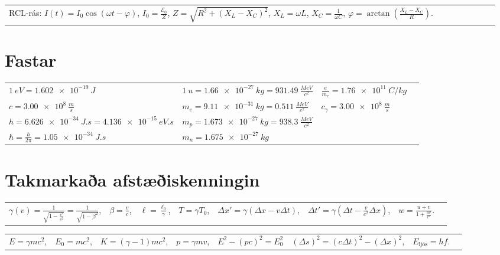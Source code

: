 \begin{table}[H]
\begin{tabular}{llllllll}
RCL-rás: $I(t) = I_0 \cos(\omega t - \varphi)$, $I_0 = \frac{\mathcal{E}_0}{Z}$, $Z = \sqrt{R^2 + (X_L - X_C)^2}$, $X_L = \omega L$, $X_C = \frac{1}{\omega C}$, $\displaystyle \varphi = \arctan( \frac{X_L - X_C}{R})$.
\end{tabular}
\end{table}

\newpage

\section*{Fastar}

\begin{table}[H]
\begin{tabular}{llll}
$\SI{1}{eV} = \SI{1.602e-19}{J}$ &  $\SI{1}{u} = \SI{1.66e-27}{kg} = \SI{931.49}{\frac{MeV}{c^2}}$ & $\frac{e}{m_e} = \SI{1.76e11}{C/kg}$  &  \\
$c = \SI{3.00e8}{\frac{m}{s}}$ & $m_e = \SI{9.11e-31}{kg} = \SI{0.511}{\frac{MeV}{c^2}}$ & $c_{\gamma} = \SI{3.00e8}{\frac{m}{s}}$ & \\
 $h = \SI{6.626e-34}{J.s} = \SI{4.136e-15}{eV.s}$ & $m_p = \SI{1.673e-27}{kg} = \SI{938.3}{\frac{MeV}{c^2}}$ &  & \\
 $\hbar = \frac{h}{2\pi} = \SI{1.05e-34}{J.s}$ & $m_n = \SI{1.675e-27}{kg}$ &  & \\
\end{tabular}
\end{table}

\section*{Takmarkaða afstæðiskenningin}

\begin{table}[H]
\begin{tabular}{llllllll}
$\gamma(v) = \frac{1}{\sqrt{1- \frac{v^2}{c^2}}} = \frac{1}{\sqrt{1-\beta^2}}$, & $\beta = \frac{v}{c}$, & $\ell = \frac{\ell_0}{\gamma}$, & $T = \gamma T_0$, & $\Delta x' = \gamma \left( \Delta x - v \Delta t \right)$, & $\Delta t' = \gamma \left( \Delta t - \frac{v}{c^2}\Delta x \right)$, & $w = \frac{u+v}{1 + \frac{uv}{c^2}}$.
\end{tabular}
\end{table}

\begin{table}[H]
\begin{tabular}{llllllll}
$E = \gamma mc^2$, & $E_0 = mc^2$, & $K = (\gamma -1)mc^2$, & $p = \gamma mv$, & $E^2 - (pc)^2 = E_0^2$ & $\left(\Delta s\right)^2 = (c\Delta t)^2 - (\Delta x)^2$, & $E_{\text{ljós}} = hf$.
\end{tabular}
\end{table}

